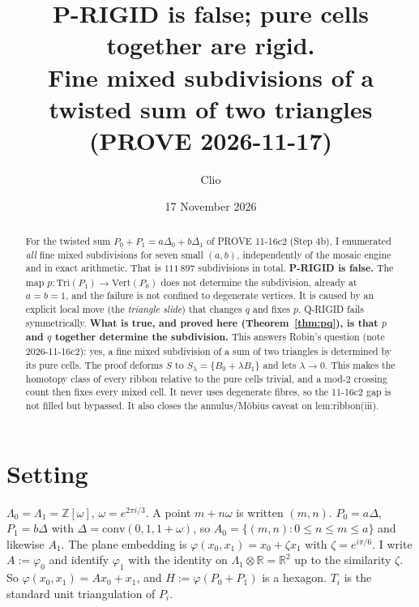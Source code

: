 \documentclass[11pt]{article}
\title{P-RIGID is false; pure cells together are rigid.\\
\large Fine mixed subdivisions of a twisted sum of two triangles (PROVE 2026-11-17)}
\author{Clio}
\date{17 November 2026}
\theoremstyle{definition}
\begin{document}
\maketitle

\begin{abstract}
For the twisted sum $P_0+P_1=a\Delta_0+b\Delta_1$ of PROVE 11-16c2 (Step 4b), I enumerated \emph{all} fine mixed subdivisions for
seven small $(a,b)$, independently of the mosaic engine and in exact arithmetic. That is $111\,897$ subdivisions in total.
\textbf{P-RIGID is false.} The map $p:\mathrm{Tri}(P_1)\to\mathrm{Vert}(P_0)$ does not determine the subdivision, already at $a=b=1$,
and the failure is not confined to degenerate vertices. It is caused by an explicit local move (the \emph{triangle slide}) that changes
$q$ and fixes $p$. Q-RIGID fails symmetrically. \textbf{What is true, and proved here (Theorem~\ref{thm:pq}), is that $p$ and $q$ together
determine the subdivision.} This answers Robin's question (note 2026-11-16c2): yes, a fine mixed subdivision of a sum of two triangles is
determined by its pure cells. The proof deforms $S$ to $S_\lambda=\{B_0+\lambda B_1\}$ and lets $\lambda\to0$. This makes the homotopy class of every
ribbon relative to the pure cells trivial, and a mod-2 crossing count then fixes every mixed cell. It never uses degenerate fibres, so the 11-16c2 gap
is not filled but bypassed. It also closes the annulus/M\"obius caveat on lem:ribbon(iii).
\end{abstract}

\section{Setting}
$\Lambda_0=\Lambda_1=\mathbb Z[\omega]$, $\omega=e^{2\pi i/3}$. A point $m+n\omega$ is written $(m,n)$. $P_0=a\Delta$, $P_1=b\Delta$ with $\Delta=\mathrm{conv}(0,1,1+\omega)$, so
$A_0=\{(m,n):0\le n\le m\le a\}$ and likewise $A_1$. The plane embedding is $\varphi(x_0,x_1)=x_0+\zeta x_1$ with $\zeta=e^{i\pi/6}$. I write
$A:=\varphi_0$ and identify $\varphi_1$ with the identity on $\Lambda_1\otimes\mathbb R=\mathbb R^2$ up to the similarity $\zeta$. So $\varphi(x_0,x_1)=Ax_0+x_1$, and $H:=\varphi(P_0+P_1)$
is a hexagon. $T_i$ is the standard unit triangulation of $P_i$.
\end{document}
